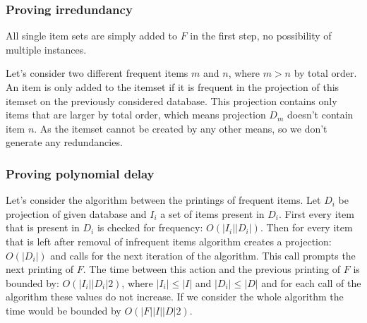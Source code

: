 \documentclass{article}
\begin{document}
  \subsubsection*{Proving irredundancy}
  All single item sets are simply added to $F$ in the first step, no possibility of multiple instances.

  Let's consider two different frequent items $m$ and $n$, where $m > n$ by total order.
  An item is only added to the itemset if it is frequent in the projection of this itemset on the previously considered database.
  This projection contains only items that are larger by total order, which means projection $D_m$ doesn't contain item $n$.
  As the itemset cannot be created by any other means, so we don't generate any redundancies.

  \subsubsection*{Proving polynomial delay}
  Let's consider the algorithm between the printings of frequent items.
  Let $D_i$ be projection of given database and $I_i$ a set of items present in $D_i$.
  First every item that is present in $D_i$ is checked for frequency: $O(|I_i||D_i|)$.
  Then for every item that is left after removal of infrequent items algorithm creates a projection:
  $O(|D_i|)$ and calls for the next iteration of the algorithm.
  This call prompts the next printing of $F$.
  The time between this action and the previous printing of $F$ is bounded by:
  $O(|I_i||D_i|2)$, where $|I_i| \leq |I|$ and $|D_i| \leq |D|$ and for each call of the algorithm these values do not increase.
  If we consider the whole algorithm the time would be bounded by $O(|F||I||D|2)$.
\end{document}
